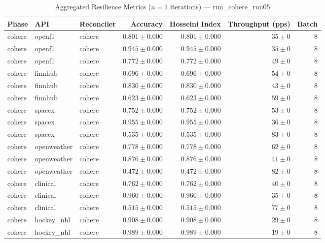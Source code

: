 
\begin{table}[htbp]
\caption{Aggregated Resilience Metrics ($n=1$ iterations) --- run_cohere_run05}
\begin{tabular}{l l l r r r r}
\hline
Phase & API & Reconciler & Accuracy & Hosseini Index & Throughput (pps) & Batch \\
\hline
cohere & openf1 & cohere & $0.801\pm0.000$ & $0.801\pm0.000$ & $35\pm0$ & 8 \\
cohere & openf1 & cohere & $0.945\pm0.000$ & $0.945\pm0.000$ & $35\pm0$ & 8 \\
cohere & openf1 & cohere & $0.772\pm0.000$ & $0.772\pm0.000$ & $49\pm0$ & 8 \\
cohere & finnhub & cohere & $0.696\pm0.000$ & $0.696\pm0.000$ & $54\pm0$ & 8 \\
cohere & finnhub & cohere & $0.830\pm0.000$ & $0.830\pm0.000$ & $43\pm0$ & 8 \\
cohere & finnhub & cohere & $0.623\pm0.000$ & $0.623\pm0.000$ & $59\pm0$ & 8 \\
cohere & spacex & cohere & $0.752\pm0.000$ & $0.752\pm0.000$ & $53\pm0$ & 8 \\
cohere & spacex & cohere & $0.955\pm0.000$ & $0.955\pm0.000$ & $36\pm0$ & 8 \\
cohere & spacex & cohere & $0.535\pm0.000$ & $0.535\pm0.000$ & $83\pm0$ & 8 \\
cohere & openweather & cohere & $0.778\pm0.000$ & $0.778\pm0.000$ & $62\pm0$ & 8 \\
cohere & openweather & cohere & $0.876\pm0.000$ & $0.876\pm0.000$ & $41\pm0$ & 8 \\
cohere & openweather & cohere & $0.472\pm0.000$ & $0.472\pm0.000$ & $82\pm0$ & 8 \\
cohere & clinical & cohere & $0.762\pm0.000$ & $0.762\pm0.000$ & $40\pm0$ & 8 \\
cohere & clinical & cohere & $0.960\pm0.000$ & $0.960\pm0.000$ & $35\pm0$ & 8 \\
cohere & clinical & cohere & $0.515\pm0.000$ & $0.515\pm0.000$ & $77\pm0$ & 8 \\
cohere & hockey\_nhl & cohere & $0.908\pm0.000$ & $0.908\pm0.000$ & $29\pm0$ & 8 \\
cohere & hockey\_nhl & cohere & $0.989\pm0.000$ & $0.989\pm0.000$ & $19\pm0$ & 8 \\

\end{tabular}
\end{table}
